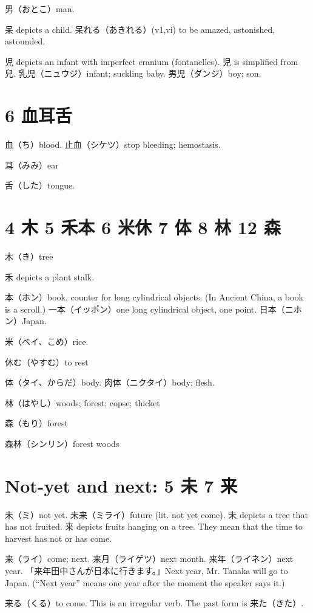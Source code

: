 男（おとこ）man.

呆 depicts a child.
呆れる（あきれる）(v1,vi) to be amazed, astonished, astounded.

児 depicts an infant with imperfect cranium (fontanelles).
児 is simplified from 兒.
乳児（ニュウジ）infant; suckling baby.
男児（ダンジ）boy; son.

\section{6 血耳舌}

血（ち）blood.
止血（シケツ）stop bleeding; hemostasis.

耳（みみ）ear

舌（した）tongue.

\section{4 木 5 禾本 6 米休 7 体 8 林 12 森}

木（き）tree

禾 depicts a plant stalk.

本（ホン）book, counter for long cylindrical objects.
(In Ancient China, a book is a scroll.)
一本（イッポン）one long cylindrical object, one point.
日本（ニホン）Japan.

米（ベイ、こめ）rice.

休む（やすむ）to rest

体（タイ、からだ）body.
肉体（ニクタイ）body; flesh.

林（はやし）woods; forest; copse; thicket

森（もり）forest

森林（シンリン）forest woods

\section{Not-yet and next: 5 未 7 来}

未（ミ）not yet.
未来（ミライ）future (lit. not yet come).
未 depicts a tree that has not fruited.
来 depicts fruits hanging on a tree.
They mean that the time to harvest has not or has come.

来（ライ）come; next.
来月（ライゲツ）next month.
来年（ライネン）next year.
「来年田中さんが日本に行きます。」Next year, Mr. Tanaka will go to Japan.
(``Next year'' means one year after the moment the speaker says it.)

来る（くる）to come.
This is an irregular verb.
The past form is 来た（きた）.

